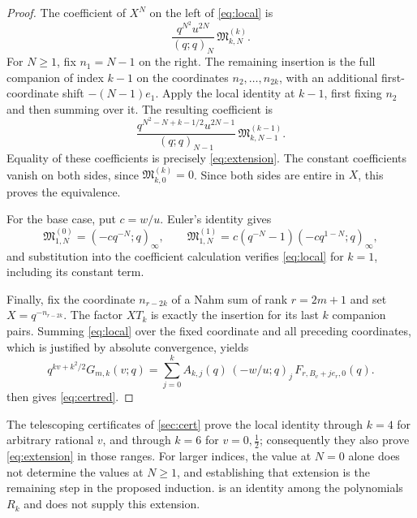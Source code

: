\begin{proof}
The coefficient of $X^N$ on the left of \eqref{eq:local} is
\[
\frac{q^{N^2}u^{2N}}{(q;q)_N}\,\mathfrak M^{(k)}_{k,N}.
\]
For $N\ge1$, fix $n_1=N-1$ on the right. The remaining insertion is the full companion of index $k-1$ on the coordinates $n_2,\dots,n_{2k}$, with an additional first-coordinate shift $-(N-1)e_1$. Apply the local identity at $k-1$, first fixing $n_2$ and then summing over it. The resulting coefficient is
\[
\frac{q^{N^2-N+k-1/2}u^{2N-1}}{(q;q)_{N-1}}\,\mathfrak M^{(k-1)}_{k,N-1}.
\]
Equality of these coefficients is precisely \eqref{eq:extension}. The constant coefficients vanish on both sides, since $\mathfrak M^{(k)}_{k,0}=0$. Since both sides are entire in $X$, this proves the equivalence.

For the base case, put $c=w/u$. Euler's identity gives
\[
\mathfrak M^{(0)}_{1,N}=(-cq^{-N};q)_\infty,\qquad \mathfrak M^{(1)}_{1,N}=c(q^{-N}-1)(-cq^{1-N};q)_\infty,
\]
and substitution into the coefficient calculation verifies \eqref{eq:local} for $k=1$, including its constant term.

Finally, fix the coordinate $n_{r-2k}$ of a Nahm sum of rank $r=2m+1$ and set $X=q^{-n_{r-2k}}$. The factor $XT_k$ is exactly the insertion for its last $k$ companion pairs. Summing \eqref{eq:local} over the fixed coordinate and all preceding coordinates, which is justified by absolute convergence, yields
\[
q^{kv+k^2/2}G_{m,k}(v;q)=\sum_{j=0}^kA_{k,j}(q)\,(-w/u;q)_j\,F_{r,B_v+je_r,0}(q).
\]
 then gives \eqref{eq:certred}.
\end{proof}

The telescoping certificates of \cref{sec:cert} prove the local identity through $k=4$ for arbitrary rational $v$, and through $k=6$ for $v=0,\frac12$; consequently they also prove \eqref{eq:extension} in those ranges. For larger indices, the value at $N=0$ alone does not determine the values at $N\ge1$, and establishing that extension is the remaining step in the proposed induction.  is an identity among the polynomials $R_k$ and does not supply this extension.
